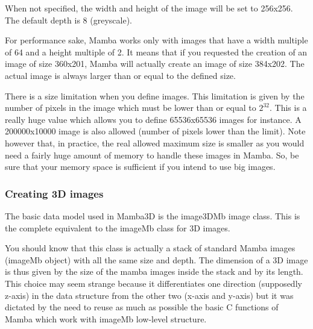\documentclass[a4paper,10pt,oneside]{article}
\begin{document}
When not specified, the width and height of the image will be set to 
256x256. The default depth is 8 (greyscale).

For performance sake, Mamba works only with images that have a width multiple of
64 and a height multiple of 2. It means that if you requested the creation of
an image of size 360x201, Mamba will actually create an image of size 384x202. 
The actual image is always larger than or equal to the defined size.

There is a size limitation when you define images. This limitation is given by
the number of pixels in the image which must be lower than or equal to $2^{32}$.
This is a really huge value which allows you to define 65536x65536 images for instance.
A 200000x10000 image is also allowed (number of pixels lower than the limit).
Note however that, in practice, the real allowed maximum size is smaller as you would
need a fairly huge amount of memory to handle these images in Mamba. So, be sure
that your memory space is sufficient if you intend to use big images.


\subsubsection{Creating 3D images}

The basic data model used in Mamba3D is the image3DMb image class. This is the
complete equivalent to the imageMb class for 3D images.

You should know that this class is actually a stack of standard Mamba images
(imageMb object) with all the same size and depth. The dimension of a 3D image
is thus given by the size of the mamba images inside the stack and by its
length. This choice may seem strange because it differentiates one direction
(supposedly z-axis) in the data structure from the other two (x-axis and
y-axis) but it was dictated by the need to reuse as much as possible the 
basic C functions of Mamba which work with imageMb low-level structure.
\end{document}
